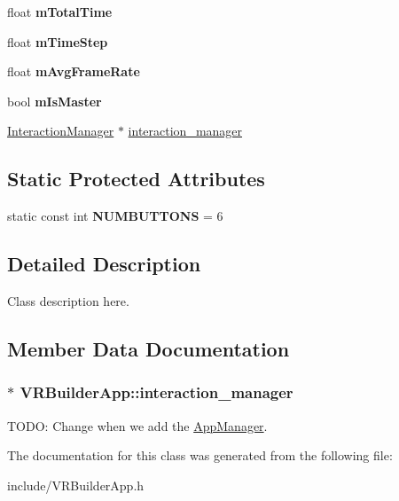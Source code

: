 \begin{DoxyCompactItemize}
\item 
\hypertarget{class_v_r_builder_app_a0b1a36989bcf1a376e7c84a67240ec85}{
float {\bfseries mTotalTime}}
\label{class_v_r_builder_app_a0b1a36989bcf1a376e7c84a67240ec85}

\item 
\hypertarget{class_v_r_builder_app_afe9a0850c147d49a6dd9eaef407a5259}{
float {\bfseries mTimeStep}}
\label{class_v_r_builder_app_afe9a0850c147d49a6dd9eaef407a5259}

\item 
\hypertarget{class_v_r_builder_app_a33381110ddc99c17935900f216a60451}{
float {\bfseries mAvgFrameRate}}
\label{class_v_r_builder_app_a33381110ddc99c17935900f216a60451}

\item 
\hypertarget{class_v_r_builder_app_a9ca4a08d097d717d540bc044700a1bca}{
bool {\bfseries mIsMaster}}
\label{class_v_r_builder_app_a9ca4a08d097d717d540bc044700a1bca}

\item 
\hyperlink{class_interaction_manager}{InteractionManager} $\ast$ \hyperlink{class_v_r_builder_app_a3ab03c777303af6cb7f163ec861a10c6}{interaction\_\-manager}
\end{DoxyCompactItemize}
\subsection*{Static Protected Attributes}
\begin{DoxyCompactItemize}
\item 
\hypertarget{class_v_r_builder_app_ac9d45f8ac228a2215944307571a165af}{
static const int {\bfseries NUMBUTTONS} = 6}
\label{class_v_r_builder_app_ac9d45f8ac228a2215944307571a165af}

\end{DoxyCompactItemize}


\subsection{Detailed Description}
Class description here. 

\subsection{Member Data Documentation}
\hypertarget{class_v_r_builder_app_a3ab03c777303af6cb7f163ec861a10c6}{
\subsubsection[{interaction\_\-manager}]{$\ast$ {\bf VRBuilderApp::interaction\_\-manager}}}
\label{class_v_r_builder_app_a3ab03c777303af6cb7f163ec861a10c6}
TODO: Change when we add the \hyperlink{class_app_manager}{AppManager}. 

The documentation for this class was generated from the following file:\begin{DoxyCompactItemize}
\item 
include/VRBuilderApp.h\end{DoxyCompactItemize}
